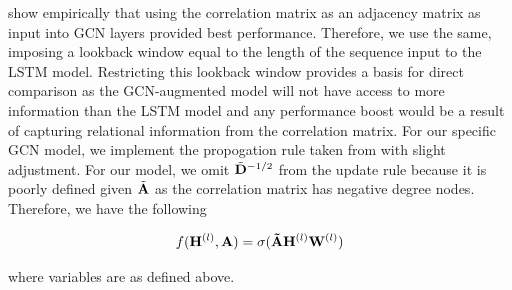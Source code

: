 \cite{Peng2021} show empirically that using the correlation matrix as an adjacency matrix as input into GCN layers provided best performance. Therefore, we use the same, imposing a lookback window equal to the length of the sequence input to the LSTM model. Restricting this lookback window provides a basis for direct comparison as the GCN-augmented model will not have access to more information than the LSTM model and any performance boost would be a result of capturing relational information from the correlation matrix. For our specific GCN model, we implement the propogation rule taken from \cite{Kipf2017} with slight adjustment. For our model, we omit $\tilde{\mVector{D}}^{-1/2}$ from the update rule because it is poorly defined given $\tilde{\mVector{A}}$ as the correlation matrix has negative degree nodes. Therefore, we have the following 

\begin{equation}
f(\mVector{H}^{(l)}, \mVector{A}) = \sigma(\mVector{\tilde{A}}\mVector{H}^{(l)}\mVector{W}^{(l)})
\end{equation}

where variables are as defined above.